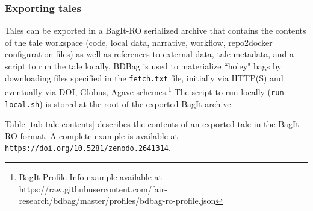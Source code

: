 \documentclass[conference]{IEEEtran}
\begin{document}
\subsubsection{Exporting tales}


Tales can be exported in a BagIt-RO serialized archive that contains
the contents of the tale workspace (code, local data, narrative,
workflow, repo2docker configuration files) as well as references to
external data, tale metadata, and a script to run the tale
locally. BDBag \cite{chard2016} is used to materialize ``holey" bags
by downloading files specified in the \texttt{fetch.txt} file,
initially via HTTP(S) and eventually via DOI, Globus, Agave
schemes.\footnote {BagIt-Profile-Info example available at https://raw.githubusercontent.com/fair-research/bdbag/master/profiles/bdbag-ro-profile.json}  The script to run locally  (\texttt{run-local.sh}) is stored at the root of the exported BagIt archive.

Table \ref{tab-tale-contents} describes the contents of an exported tale in the BagIt-RO format. A complete example is available at \texttt{https://doi.org/10.5281/zenodo.2641314}.
\end{document}
